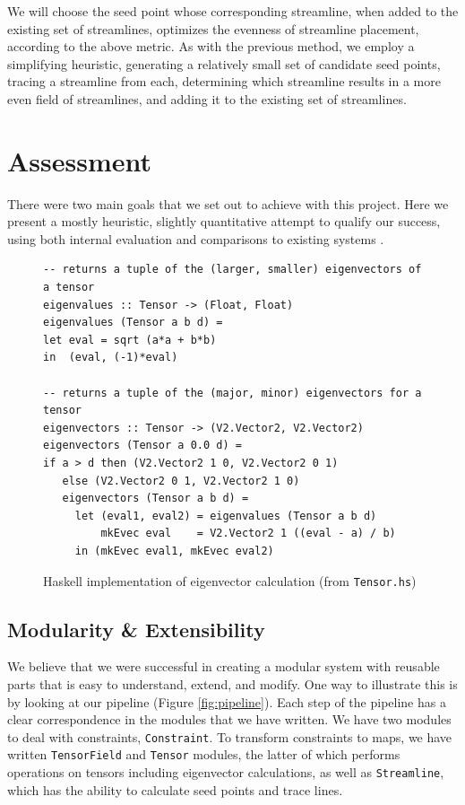 \documentclass[twocolumn]{article}
\begin{document}
We will choose the seed point whose corresponding streamline, when added to the
existing set of streamlines, optimizes the evenness of streamline placement,
according to the above metric. As with the previous method, we employ a
simplifying heuristic, generating a relatively small set of candidate seed
points, tracing a streamline from each, determining which streamline results in
a more even field of streamlines, and adding it to the existing set of
streamlines.

\section{Assessment}
There were two main goals that we set out to achieve with this project. Here we
present a mostly heuristic, slightly quantitative attempt to qualify our
success, using both internal evaluation and comparisons to existing systems
\cite{chen}.

\begin{figure}[t!]
\begin{Verbatim}[frame=single]
-- returns a tuple of the (larger, smaller) eigenvectors of a tensor
eigenvalues :: Tensor -> (Float, Float)
eigenvalues (Tensor a b d) =
let eval = sqrt (a*a + b*b)
in  (eval, (-1)*eval)

-- returns a tuple of the (major, minor) eigenvectors for a tensor
eigenvectors :: Tensor -> (V2.Vector2, V2.Vector2)
eigenvectors (Tensor a 0.0 d) =
if a > d then (V2.Vector2 1 0, V2.Vector2 0 1)
   else (V2.Vector2 0 1, V2.Vector2 1 0)
   eigenvectors (Tensor a b d) =
     let (eval1, eval2) = eigenvalues (Tensor a b d)
         mkEvec eval    = V2.Vector2 1 ((eval - a) / b)
     in (mkEvec eval1, mkEvec eval2)
\end{Verbatim}

\caption{Haskell implementation of eigenvector calculation (from
            \texttt{Tensor.hs})}
\label{fig:evecs}
\end{figure}

\subsection{Modularity \& Extensibility}
We believe that we were successful in creating a modular system with reusable
parts that is easy to understand, extend, and modify. One way to illustrate
this is by looking at our pipeline (Figure \ref{fig:pipeline}). Each step of
the pipeline has a clear correspondence in the modules that we have written.
We have two modules to deal with constraints, \texttt{Constraint}. To transform
constraints to maps, we have written \texttt{TensorField} and \texttt{Tensor}
modules, the latter of which performs operations on tensors including
eigenvector calculations, as well as \texttt{Streamline}, which has the ability
to calculate seed points and trace lines.
\end{document}
